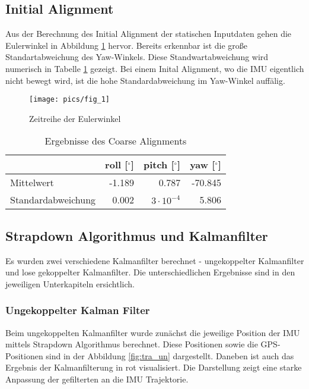 
\subsection{Initial Alignment}

Aus der Berechnung des Initial Alignment der statischen Inputdaten gehen die Eulerwinkel in Abbildung \ref{fig:ts_euler} hervor. Bereits erkennbar ist die große Standartabweichung des Yaw-Winkels. Diese Standwartabweichung wird numerisch in Tabelle \ref{tab:euler} gezeigt. Bei einem Inital Alignment, wo die IMU eigentlich nicht bewegt wird, ist die hohe Standardabweichung im Yaw-Winkel auffälig.

\begin{figure}[htbp]
	\center
 	\texttt{[image: pics/fig\_1]}
	\caption{Zeitreihe der Eulerwinkel}
	\label{fig:ts_euler}
\end{figure}

\begin{table}[htbp]
	\centering
	\label{tab:euler}
	\caption{Ergebnisse des Coarse Alignments}
	\begin{tabular}{lrrr}
	&roll [$^\circ$]&pitch [$^\circ$]&yaw [$^\circ$]\\\toprule
	Mittelwert&-1.189& 0.787& -70.845\\
	Standardabweichung&0.002&$3\cdot10^{-4}$& 5.806\\\bottomrule
	\end{tabular}
\end{table}

\subsection{Strapdown Algorithmus und Kalmanfilter}
Es wurden zwei verschiedene Kalmanfilter berechnet - ungekoppelter Kalmanfilter und lose gekoppelter Kalmanfilter. Die unterschiedlichen Ergebnisse sind in den jeweiligen Unterkapiteln ersichtlich.

\subsubsection{Ungekoppelter Kalman Filter}

Beim ungekoppelten Kalmanfilter wurde zunächst die jeweilige Position der IMU mittels Strapdown Algorithmus berechnet. Diese Positionen sowie die GPS-Positionen sind in der Abbildung \ref{fig:tra_un} dargestellt. Daneben ist auch das Ergebnis der Kalmanfilterung in rot visualisiert. Die Darstellung zeigt eine starke Anpassung der gefilterten an die IMU Trajektorie.

